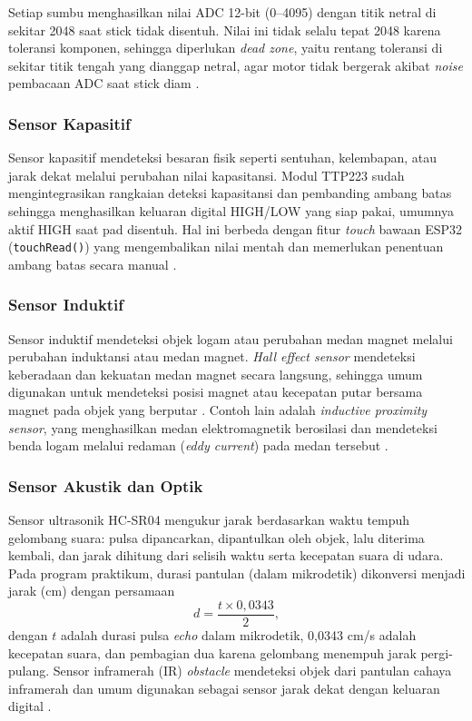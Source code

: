 Setiap sumbu menghasilkan nilai ADC 12-bit (0--4095) dengan titik netral di
sekitar 2048 saat stick tidak disentuh. Nilai ini tidak selalu tepat 2048
karena toleransi komponen, sehingga diperlukan \textit{dead zone}, yaitu
rentang toleransi di sekitar titik tengah yang dianggap netral, agar motor
tidak bergerak akibat \textit{noise} pembacaan ADC saat stick diam
.

\subsubsection{Sensor Kapasitif}
Sensor kapasitif mendeteksi besaran fisik seperti sentuhan, kelembapan, atau
jarak dekat melalui perubahan nilai kapasitansi. Modul TTP223 sudah
mengintegrasikan rangkaian deteksi kapasitansi dan pembanding ambang batas
sehingga menghasilkan keluaran digital HIGH/LOW yang siap pakai, umumnya aktif
HIGH saat pad disentuh. Hal ini berbeda dengan fitur \textit{touch} bawaan ESP32
(\texttt{touchRead()}) yang mengembalikan nilai mentah dan memerlukan
penentuan ambang batas secara manual .


\subsubsection{Sensor Induktif}
Sensor induktif mendeteksi objek logam atau perubahan medan magnet melalui
perubahan induktansi atau medan magnet. \textit{Hall effect sensor} mendeteksi
keberadaan dan kekuatan medan magnet secara langsung, sehingga umum digunakan
untuk mendeteksi posisi magnet atau kecepatan putar bersama magnet pada objek
yang berputar . Contoh lain adalah \textit{inductive
proximity sensor}, yang menghasilkan medan elektromagnetik berosilasi dan
mendeteksi benda logam melalui redaman (\textit{eddy current}) pada medan
tersebut .

\subsubsection{Sensor Akustik dan Optik}
Sensor ultrasonik HC-SR04 mengukur jarak berdasarkan waktu tempuh gelombang
suara: pulsa dipancarkan, dipantulkan oleh objek, lalu diterima kembali, dan
jarak dihitung dari selisih waktu serta kecepatan suara di udara. Pada program praktikum, durasi pantulan (dalam
mikrodetik) dikonversi menjadi jarak (cm) dengan persamaan
\begin{equation}
  d = \frac{t \times 0{,}0343}{2},
\end{equation}
dengan $t$ adalah durasi pulsa \textit{echo} dalam mikrodetik, 0,0343 cm/\textmu s
adalah kecepatan suara, dan pembagian dua karena gelombang menempuh jarak
pergi-pulang. Sensor inframerah (IR) \textit{obstacle} mendeteksi
objek dari pantulan cahaya inframerah dan umum digunakan sebagai sensor jarak
dekat dengan keluaran digital .

